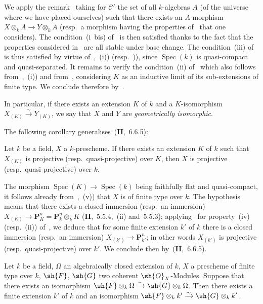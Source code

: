 We apply the remark~ taking for $\mathcal{C}'$ the set of all $k$-algebras $A$ (of the universe where we have placed ourselves) such that there exists an $A$-morphism $X\otimes_k A\to Y\otimes_k A$ (resp.\ a morphism having the properties of~ that one considers).
The condition~(i~bis) of~ is then satisfied thanks to the fact that the
properties considered in~ are all stable under base change.
The condition~(iii) of~ is thus satisfied by virtue of~,~(i)) (resp.\ )), since $\operatorname{Spec}(k)$ is quasi-compact and quasi-separated.
It remains to verify the condition~(ii) of~ which also follows from~,~(i)) and from~, considering $K$ as an inductive limit of its sub-extensions of finite type.
We conclude therefore by~.

In particular, if there exists an extension $K$ of $k$ and a $K$-isomorphism $X_{(K)}\xrightarrow{\sim} Y_{(K)}$, we say that $X$ and $Y$ are \emph{geometrically isomorphic}.

The following corollary generalises~(\textbf{II},~6.6.5):

\begin{corollary}[9.1.5]
\label{IV.9.1.5}
Let $k$ be a field, $X$ a $k$-prescheme.
If there exists an extension $K$ of $k$ such that $X_{(K)}$ is projective \textnormal{(}resp.\ quasi-projective\textnormal{)} over $K$, then $X$ is projective \textnormal{(}resp.\ quasi-projective\textnormal{)} over $k$.
\end{corollary}

The morphism $\operatorname{Spec}(K)\to\operatorname{Spec}(k)$ being faithfully flat and quasi-compact, it follows already from~,~(v)) that $X$ is of finite type over $k$.
The hypothesis means that there exists a closed immersion (resp.\ an immersion) $X_{(K)}\to\mathbf{P}_K^n=\mathbf{P}_k^n\otimes_k K$ (\textbf{II},~5.5.4,~(ii) and~5.5.3); applying~ for property~(iv) (resp.~(ii)) of~, we deduce that for some finite extension $k'$ of $k$ there is a closed immersion (resp.\ an immersion) $X_{(k')}\to\mathbf{P}_{k'}^n$; in other words $X_{(k')}$ is projective (resp.\ quasi-projective) over $k'$.
We conclude then by~(\textbf{II},~6.6.5).

\begin{proposition}[9.1.6]
\label{IV.9.1.6}
Let $k$ be a field, $\Omega$ an algebraically closed extension of $k$, $X$ a prescheme of finite type over $k$, $\sh{F}$, $\sh{G}$ two coherent $\sh{O}_X$-Modules.
Suppose that there exists an isomorphism $\sh{F}\otimes_k\Omega\xrightarrow{\sim}\sh{G}\otimes_k\Omega$.
Then there exists a finite extension $k'$ of $k$ and an isomorphism $\sh{F}\otimes_k k'\xrightarrow{\sim}\sh{G}\otimes_k k'$.
\end{proposition}

